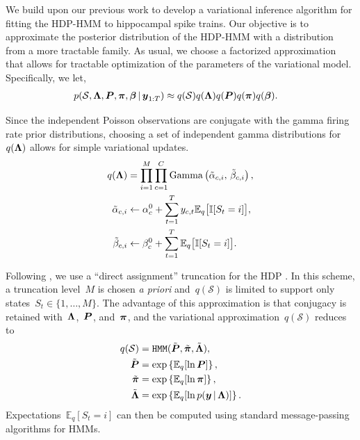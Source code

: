 We build upon our previous work \citep{Chen12a,Chen14,Johnson14} to
develop a variational inference algorithm for fitting the HDP-HMM to
hippocampal spike trains. Our objective is to approximate the
posterior distribution of the HDP-HMM with a distribution from a more
tractable family. As usual, we choose a factorized approximation that
allows for tractable optimization of the parameters of the variational
model. Specifically, we let,
\begin{align}
p(\mathcal{S}, \boldsymbol{\Lambda}, \boldsymbol{P}, \boldsymbol{\pi}, \boldsymbol{\beta} \,|\, \boldsymbol{y}_{1:T}) &\approx q(\mathcal{S}) q(\boldsymbol{\Lambda}) q(\boldsymbol{P}) q(\boldsymbol{\pi}) q(\boldsymbol{\beta}).
\end{align}

Since the independent Poisson observations are conjugate with the
gamma firing rate prior distributions, choosing a set of independent
gamma distributions for~$q(\boldsymbol{\Lambda})$ allows for simple variational
updates.
\begin{align}
q(\boldsymbol{\Lambda}) &= \prod_{i=1}^M \prod_{c=1}^C \mathrm{Gamma}\left(\tilde{\alpha}_{c,i},\, \tilde{\beta}_{c,i} \right), \\
\nonumber \tilde{\alpha}_{c,i} &\leftarrow \alpha_c^{0} + \sum_{t=1}^T y_{c,t} \mathbb{E}_q\big[\mathbb{I}[S_t=i]\big], \\
\nonumber \tilde{\beta}_{c,i} &\leftarrow\beta_c^{0} + \sum_{t=1}^T \mathbb{E}_q\big[\mathbb{I}[S_t=i]\big].
\end{align}

Following \citep{Johnson14}, we use a ``direct assignment'' truncation
for the HDP \citep{Bryant12, Liang07}. In this scheme, a truncation
level~$M$ is chosen {\it a priori} and~$q(\mathcal{S})$ is limited to
support only states~${S_t\in\{1,\ldots,M\}}$. The advantage of this
approximation is that conjugacy is retained with~$\boldsymbol{\Lambda}$,~$\boldsymbol{P}$,
and~$\boldsymbol{\pi}$, and the variational approximation~$q(\mathcal{S})$ reduces
to
\begin{align}
q(\mathcal{S}) &= \texttt{HMM}(\tilde{\boldsymbol{P}}, \tilde{\boldsymbol{\pi}}, \tilde{\boldsymbol{\Lambda}}), \\
\nonumber \tilde{\boldsymbol{P}} &= \exp\left\{\mathbb{E}_q[\ln \boldsymbol{P}]\right\}, \\
\nonumber \tilde{\boldsymbol{\pi}} &= \exp\left\{\mathbb{E}_q[\ln \boldsymbol{\pi}]\right\}, \\
\nonumber \tilde{\boldsymbol{\Lambda}} &= \exp\left\{\mathbb{E}_q[\ln p(\boldsymbol{y} \,|\, \boldsymbol{\Lambda})]\right\}.
\end{align}
Expectations~${\mathbb{E}_q[S_t=i]}$ can then be computed using
standard message-passing algorithms for HMMs.

